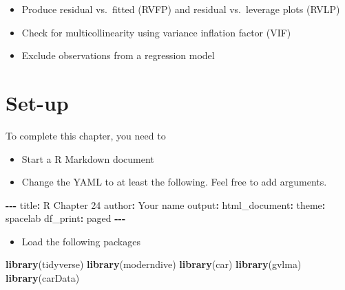 \documentclass[
]{book}
\makeatletter
\newenvironment{Shaded}{\begin{snugshade}}{\end{snugshade}}
\newcommand{\FunctionTok}[1]{\textcolor[rgb]{0.27,0.27,0.27}{\textbf{#1}}}
\newcommand{\NormalTok}[1]{#1}
\newcommand{\SpecialCharTok}[1]{\textcolor[rgb]{0.43,0.43,0.43}{\textbf{#1}}}
\newcommand{\StringTok}[1]{\textcolor[rgb]{0.5,0.5,0.5}{#1}}
\providecommand{\tightlist}{%
  \setlength{\itemsep}{0pt}\setlength{\parskip}{0pt}}
\newenvironment{kframe}{%
\medskip{}
\setlength{\fboxsep}{.8em}
 \def\at@end@of@kframe{}%
 \ifinner\ifhmode%
  \def\at@end@of@kframe{\end{minipage}}%
  \begin{minipage}{\columnwidth}%
 \fi\fi%
 \def\FrameCommand##1{\hskip\@totalleftmargin \hskip-\fboxsep
 \colorbox{shadecolor}{##1}\hskip-\fboxsep
     \hskip-\linewidth \hskip-\@totalleftmargin \hskip\columnwidth}%
 \MakeFramed {\advance\hsize-\width
   \@totalleftmargin\z@ \linewidth\hsize
   \@setminipage}}%
 {\par\unskip\endMakeFramed%
 \at@end@of@kframe}
\renewenvironment{Shaded}{\begin{kframe}}{\end{kframe}}
\makeatother
\begin{document}
\begin{itemize}
\tightlist
\item
  Produce residual vs.~fitted (RVFP) and residual vs.~leverage plots (RVLP)
\item
  Check for multicollinearity using variance inflation factor (VIF)
\item
  Exclude observations from a regression model
\end{itemize}

\hypertarget{set-up-7}{%
\section{Set-up}\label{set-up-7}}

To complete this chapter, you need to

\begin{itemize}
\tightlist
\item
  Start a R Markdown document
\item
  Change the YAML to at least the following. Feel free to add arguments.
\end{itemize}

\begin{Shaded}
\begin{Highlighting}[]
\SpecialCharTok{{-}{-}{-}}
\NormalTok{title}\SpecialCharTok{:} \StringTok{\textquotesingle{}R Chapter 24\textquotesingle{}}
\NormalTok{author}\SpecialCharTok{:} \StringTok{\textquotesingle{}Your name\textquotesingle{}}
\NormalTok{output}\SpecialCharTok{:} 
\NormalTok{  html\_document}\SpecialCharTok{:}
\NormalTok{    theme}\SpecialCharTok{:}\NormalTok{ spacelab}
\NormalTok{    df\_print}\SpecialCharTok{:}\NormalTok{ paged}
\SpecialCharTok{{-}{-}{-}}
\end{Highlighting}
\end{Shaded}

\begin{itemize}
\tightlist
\item
  Load the following packages
\end{itemize}

\begin{Shaded}
\begin{Highlighting}[]
\FunctionTok{library}\NormalTok{(tidyverse)}
\FunctionTok{library}\NormalTok{(moderndive)}
\FunctionTok{library}\NormalTok{(car)}
\FunctionTok{library}\NormalTok{(gvlma)}
\FunctionTok{library}\NormalTok{(carData)}
\end{Highlighting}
\end{Shaded}
\end{document}
